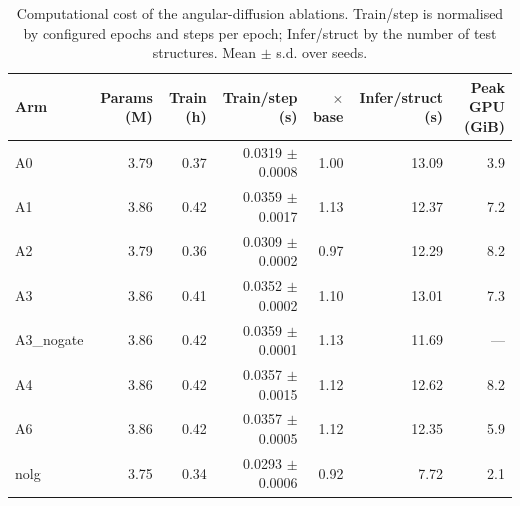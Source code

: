 \begin{table}[htbp]
\centering
\small
\caption{Computational cost of the angular-diffusion ablations. Train/step is normalised by configured epochs and steps per epoch; Infer/struct by the number of test structures. Mean $\pm$ s.d. over seeds.}
\begin{tabular}{lrrrrrr}
\toprule
Arm & Params (M) & Train (h) & Train/step (s) & $\times$ base & Infer/struct (s) & Peak GPU (GiB) \\
\midrule
A0 & 3.79 & 0.37 & 0.0319 $\pm$ 0.0008 & 1.00 & 13.09 & 3.9 \\
A1 & 3.86 & 0.42 & 0.0359 $\pm$ 0.0017 & 1.13 & 12.37 & 7.2 \\
A2 & 3.79 & 0.36 & 0.0309 $\pm$ 0.0002 & 0.97 & 12.29 & 8.2 \\
A3 & 3.86 & 0.41 & 0.0352 $\pm$ 0.0002 & 1.10 & 13.01 & 7.3 \\
A3\_nogate & 3.86 & 0.42 & 0.0359 $\pm$ 0.0001 & 1.13 & 11.69 & --- \\
A4 & 3.86 & 0.42 & 0.0357 $\pm$ 0.0015 & 1.12 & 12.62 & 8.2 \\
A6 & 3.86 & 0.42 & 0.0357 $\pm$ 0.0005 & 1.12 & 12.35 & 5.9 \\
nolg & 3.75 & 0.34 & 0.0293 $\pm$ 0.0006 & 0.92 & 7.72 & 2.1 \\
\bottomrule
\end{tabular}
\end{table}
